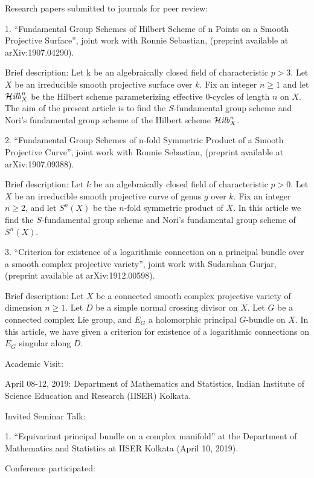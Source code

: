 \documentclass[11pt,a4paper,leqno]{article}
\numberwithin{equation}{subsection}
\theoremstyle{definition}
\begin{document}
	Research papers submitted to journals for peer review: 
	
	1. “Fundamental Group Schemes of Hilbert Scheme of n Points on a Smooth Projective Surface”, joint work with Ronnie Sebastian, (preprint available at arXiv:1907.04290). 
	
	Brief description: Let k be an algebraically closed field of characteristic $p > 3$. 
	Let $X$ be an irreducible smooth projective surface over $k$. Fix an integer $n \geq 1$ and let 
	$\mathcal{H}{\it ilb}_X^n$ be the Hilbert scheme parameterizing effective $0$-cycles of length $n$ on $X$. 
	The aim of the present article is to find the $S$-fundamental group scheme and Nori's fundamental group scheme 
	of the Hilbert scheme $\mathcal{H}{\it ilb}_X^n$.  
	
	2. “Fundamental Group Schemes of n-fold Symmetric Product of a Smooth Projective Curve”, joint work with Ronnie Sebastian, (preprint available at arXiv:1907.09388).
	
	Brief description: Let $k$ be an algebraically closed field of characteristic $p > 0$. 
	Let $X$ be an irreducible smooth projective curve of genus $g$ over $k$. Fix an integer $n \geq 2$, 
	and let $S^n(X)$ be the $n$-fold symmetric product of $X$. In this article we find the $S$-fundamental 
	group scheme and Nori's fundamental group scheme of $S^n(X)$.  
	
	3. “Criterion for existence of a logarithmic connection on a principal bundle over a smooth complex projective variety”, joint work with Sudarshan Gurjar, (preprint available at arXiv:1912.00598).
	
	Brief description: Let $X$ be a connected smooth complex projective variety of dimension $n \geq 1$. 
	Let $D$ be a simple normal crossing divisor on $X$. Let $G$ be a connected complex Lie group, and 
	$E_G$ a holomorphic principal $G$-bundle on $X$. In this article, we have given a criterion for 
	existence of a logarithmic connections on $E_G$ singular along $D$. 
	
	Academic Visit: 
	
	April 08-12, 2019: Department of Mathematics and Statistics, Indian Institute of Science Education and Research (IISER) Kolkata. 
	
	Invited Seminar Talk:
	
	1. “Equivariant principal bundle on a complex manifold” at the Department of Mathematics and Statistics at IISER Kolkata (April 10, 2019). 
	
	Conference participated:
	
\end{document}
